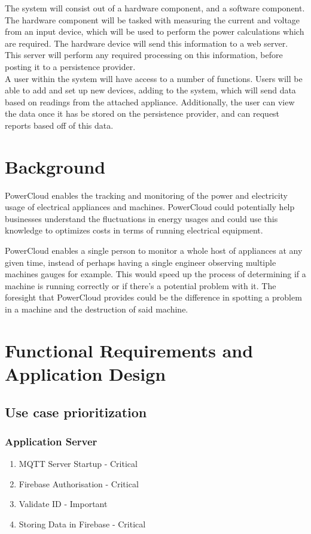 \documentclass{article}
\begin{document}
	The system will consist out of a hardware component, and a software component. The hardware component will be tasked with 
	measuring the current and voltage from an input device, which will be used to perform the power calculations which are 
	required. The hardware device will send this information to a web server. This server will perform any required processing 
	on this information, before posting it to a persistence provider.\\
	
	A user within the system will have access to a number of functions. Users will be able to add and set up new devices, 
	adding to the system, which will send data based on readings from the attached appliance. Additionally, the user can view 
	the data once it has be stored on the persistence provider, and can request reports based off of this data.
	
	\section{Background}
	PowerCloud enables the tracking and monitoring of the power and electricity 
	usage of electrical appliances and machines. PowerCloud could potentially help 
	businesses understand the fluctuations in energy usages and could use this 
	knowledge to optimizes costs in terms of running electrical equipment.
	
	PowerCloud enables a single person to monitor a whole host of appliances at any 
	given time, instead of perhaps having a single engineer observing multiple 
	machines gauges for example. This would speed up the process of determining if 
	a machine is running correctly or if there's a potential problem with it. The 
	foresight that PowerCloud provides could be the difference in spotting a 
	problem in a machine and the destruction of said machine.
	\newpage
	\section{Functional Requirements and Application Design}
	\subsection{Use case prioritization}
	\subsubsection{Application Server}
	\begin{enumerate}
		\item	MQTT Server Startup - Critical
		\item	Firebase Authorisation - Critical
		\item	Validate ID - Important
		\item	Storing Data in Firebase - Critical
	\end{enumerate}
\end{document}
